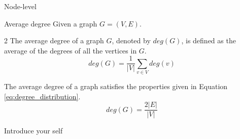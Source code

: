 \documentclass{beamer}
\begin{document}
    \begin{frame}{Node-level}
        \begin{exampleblock}{Average degree}
            Given a graph $G = (V, E)$. \newline
            
            \begin{multicols}{2} %
                The average degree of a graph $G$, denoted by $deg(G)$, is defined as the average of the degrees of all the vertices in $G$.
                \begin{equation}
                    deg(G) = \frac{1}{|V|}\sum_{v \in V}deg(v)
                    \label{eq:degree_distribution}
                \end{equation}
        
                The average degree of a graph satisfies the properties given in Equation \ref{eq:degree_distribution}.
                \begin{equation}
                    deg(G) = \frac{2|E|}{|V|}
                    \label{eq:degree_distribution_property}
                \end{equation}
            \end{multicols}
        \end{exampleblock}
        \vspace{-5mm}


        \begin{note}
            {Introduce your self}
        \end{note}
    \end{frame}
\end{document}
